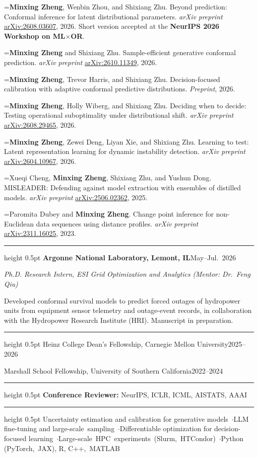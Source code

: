 \documentclass[11pt,letterpaper]{article}
\newcommand{\cvsection}[1]{\par\vspace{6pt}{\large\bfseries\scshape #1}\par\vspace{1.5pt}\hrule height 0.5pt\vspace{5pt}}
\newcommand{\cvsub}[1]{\par\vspace{3pt}{\itshape #1}\par\vspace{2pt}}
\newcommand{\dated}[3]{\textbf{#1}\hfill #3\par\emph{#2}\par\vspace{4pt}}
\newlength{\reflabel}\setlength{\reflabel}{2.7em}
\newcommand{\pub}[2]{\par\hangindent=\reflabel\hangafter=1\noindent\makebox[\reflabel][l]{[#1]}#2\par\vspace{0.8pt}}
\newcommand{\me}{\textbf{Minxing Zheng}}
\begin{document}
\cvsub{Preprints}
\pub{P1}{\me{}, Wenbin Zhou, and Shixiang Zhu. Beyond prediction: Conformal inference for latent distributional parameters. \emph{arXiv preprint} \href{https://arxiv.org/abs/2608.03607}{arXiv:2608.03607}, 2026. Short version accepted at the \textbf{NeurIPS 2026 Workshop on ML$\times$OR}.}
\pub{P2}{\me{} and Shixiang Zhu. Sample-efficient generative conformal prediction. \emph{arXiv preprint} \href{https://arxiv.org/abs/2610.11349}{arXiv:2610.11349}, 2026.}
\pub{P3}{\me{}, Trevor Harris, and Shixiang Zhu. Decision-focused calibration with adaptive conformal predictive distributions. \emph{Preprint}, 2026.}
\pub{P4}{\me{}, Holly Wiberg, and Shixiang Zhu. Deciding when to decide: Testing operational suboptimality under distributional shift. \emph{arXiv preprint} \href{https://arxiv.org/abs/2608.29465}{arXiv:2608.29465}, 2026.}
\pub{P5}{\me{}, Zewei Deng, Liyan Xie, and Shixiang Zhu. Learning to test: Latent representation learning for dynamic instability detection. \emph{arXiv preprint} \href{https://arxiv.org/abs/2604.10967}{arXiv:2604.10967}, 2026.}
\pub{P6}{Xueqi Cheng, \me{}, Shixiang Zhu, and Yushun Dong. MISLEADER: Defending against model extraction with ensembles of distilled models. \emph{arXiv preprint} \href{https://arxiv.org/abs/2506.02362}{arXiv:2506.02362}, 2025.}
\pub{P7}{Paromita Dubey and \me{}. Change point inference for non-Euclidean data sequences using distance profiles. \emph{arXiv preprint} \href{https://arxiv.org/abs/2311.16025}{arXiv:2311.16025}, 2023.}

\cvsection{Internship Experience}
\dated{Argonne National Laboratory\normalfont, Lemont, IL}{Ph.D. Research Intern, ESI Grid Optimization and Analytics (Mentor: Dr.\ Feng Qiu)}{May--Jul.\ 2026}
\vspace{-2pt}Developed conformal survival models to predict forced outages of hydropower units from equipment sensor telemetry and outage-event records, in collaboration with the Hydropower Research Institute (HRI). Manuscript in preparation.\par
\cvsection{Honors and Fellowships}
Heinz College Dean's Fellowship, Carnegie Mellon University\hfill 2025--2026\par\vspace{2pt}
Marshall School Fellowship, University of Southern California\hfill 2022--2024\par

\cvsection{Service}
\textbf{Conference Reviewer:} NeurIPS, ICLR, ICML, AISTATS, AAAI\par

\cvsection{Technical Skills}
Uncertainty estimation and calibration for generative models~$\cdot$\hspace{0.5em}LLM fine-tuning and large-scale~sampling~$\cdot$\hspace{0.5em}Differentiable optimization for decision-focused learning~$\cdot$\hspace{0.5em}\mbox{Large-scale HPC experiments (Slurm, HTCondor)}~$\cdot$\hspace{0.5em}Python (PyTorch,~JAX), R, C++,~MATLAB\par
\end{document}
